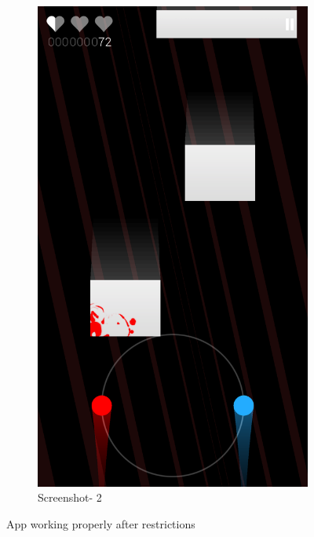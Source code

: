 \begin{figure}[h]
\begin{subfigure}[h]{0.45\textwidth}
		\includegraphics[width=\textwidth]{duet2.png}
		\caption{Screenshot- 2}
	\end{subfigure}
	\caption{App working properly after restrictions}
	\label{fig:duet}
\end{figure}